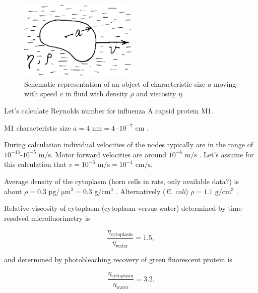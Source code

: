 \begin{figure}
\begin{center}
\includegraphics[width=0.5\textwidth]{D_chapters/6_appendix/Reynolds_number.PNG}
\caption[Schematic representation of an object moving in fluid]{Schematic representation of an object of characteristic size $a$ moving with speed $v$ in fluid with density $\rho$ and viscosity $\eta$.}
\end{center}
\end{figure}

Let's calculate Reynolds number for influenza A capsid protein M1.

M1 characteristic size $a = 4 \text{ nm} = 4 \cdot 10^{-7} \text{ cm}$ \cite{shtykova2013structural}.

During calculation individual velocities of the nodes typically are in the range of $10^{-13}$-$10^{-5} \text{ m/s}$. Motor forward velocities are around $10^{-6} \text{ m/s}$ \cite{muller2008tug}. Let's assume for this calculation that $v = 10^{-6} \text{ m/s} = 10^{-4} \text{ cm/s}$.

Average density of the cytoplasm (horn cells in rats, only available data?) is about $\rho = 0.3 \text{ pg}/\SI{}{\micro\meter}^3 = 0.3 \text{ g}/\text{cm}^3$ \cite{hartmann1967cytoplasmic}. Alternatively (\textit{E. coli}) $\rho = 1.1 \text{ g}/\text{cm}^3$ \cite{loferer1998determination}.

Relative viscosity of cytoplasm (cytoplasm versus water) determined by time-resolved microfluorimetry \cite{swaminathan1997photobleaching} is

\begin{equation}
\frac{\eta_\text{cytoplasm}}{\eta_\text{water}} = 1.5,
\end{equation}

and determined by photobleaching recovery of green fluorescent protein \cite{swaminathan1997photobleaching} is 

\begin{equation}
\frac{\eta_\text{cytoplasm}}{\eta_\text{water} }= 3.2.
\end{equation}

